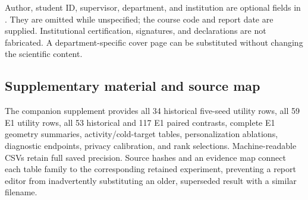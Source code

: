 Author, student ID, supervisor, department, and institution are optional
fields in . They are omitted while unspecified;
the course code and report date are supplied. Institutional certification,
signatures, and declarations are not fabricated. A department-specific
cover page can be substituted without changing the scientific content.

\subsection{Supplementary material and source map}
The companion supplement provides all 34 historical five-seed utility rows,
all 59 E1 utility rows, all 53 historical and 117 E1 paired contrasts,
complete E1 geometry summaries, activity/cold-target tables, personalization
ablations, diagnostic endpoints, privacy calibration, and rank selections.
Machine-readable CSVs retain full saved precision. Source hashes and an
evidence map connect each table family to the corresponding retained
experiment, preventing a report editor from inadvertently substituting an
older, superseded result with a similar filename.
